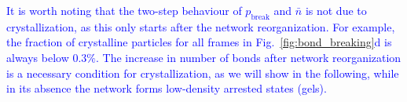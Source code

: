\documentclass[preprint,amsmath,amssymb,superscriptaddress]{revtex4-1}
\begin{document}
\textcolor{blue}{
It is worth noting that the two-step behaviour of $p_\text{break}$ and $\bar{n}$ is not due to crystallization, as this only starts after the network reorganization. For example, the fraction of crystalline particles for all frames in Fig.~\ref{fig:bond_breaking}d is always below $0.3\%$.
The increase in number of bonds after network reorganization is a necessary condition for crystallization, as we will show in the following, while in its absence the network forms low-density arrested states (gels).
 }
 


\end{document}
